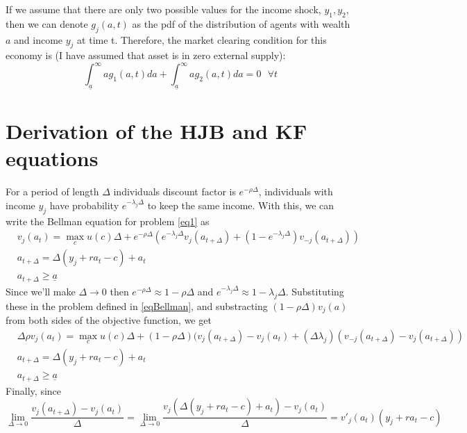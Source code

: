 \documentclass[12pt]{article}
\begin{document}
If we assume that there are only two possible values for the income shock, $y_1, y_2$, then we can denote $g_j(a,t)$ as the pdf of the distribution of agents with wealth $a$ and income $y_j$ at time t. Therefore, the market clearing condition for this economy is (I have assumed that asset is in zero external supply):
\begin{equation}
\int_{\underline{a}}^{\infty}a g_1(a,t)da+\int_{\underline{a}}^{\infty}a g_2(a,t)da=0 \text{   } \forall t
\end{equation}

\section{Derivation of the HJB and KF equations}
For a period of length $\Delta$ individuals discount factor is $e^{-\rho\Delta}$, individuals with income $y_j$ have probability $e^{-\lambda_j\Delta}$ to keep the same income. With this, we can write the Bellman equation for problem \ref{eq1} as
\begin{equation}\label{eqBellman}
\begin{split}
&v_j(a_t)=\max_{c} u(c)\Delta+e^{-\rho\Delta}(e^{-\lambda_j\Delta} v_j(a_{t+\Delta})+(1-e^{-\lambda_j\Delta} )v_{-j}(a_{t+\Delta}))\\
&a_{t+\Delta}=\Delta(y_j+ra_t-c)+a_t\\
&a_{t+\Delta}\geq \underline{a}
\end{split}
\end{equation}
Since we'll make $\Delta\rightarrow 0$ then $e^{-\rho\Delta}\approx 1-\rho\Delta$ and $e^{-\lambda_j\Delta}\approx1-\lambda_j\Delta$. Substituting these in the problem defined in \ref{eqBellman}, and substracting $(1-\rho\Delta)v_j(a)$ from both sides of the objective function, we get
\begin{equation}\label{eqBellman2}
\begin{split}
&\Delta\rho v_j(a_t)=\max_{c} u(c)\Delta+(1-\rho\Delta)( v_j(a_{t+\Delta})-v_j(a_t)+(\Delta\lambda_j)(v_{-j}(a_{t+\Delta})-v_{j}(a_{t+\Delta}))\\
&a_{t+\Delta}=\Delta(y_j+ra_t-c)+a_t\\
&a_{t+\Delta}\geq \underline{a}
\end{split}
\end{equation}
Finally, since
\begin{equation}
\lim_{\Delta\rightarrow0}\frac{v_j(a_{t+\Delta})-v_j(a_t)}{\Delta}=\lim_{\Delta\rightarrow0}\frac{v_j(\Delta(y_j+ra_t-c)+a_t)-v_j(a_t)}{\Delta}=v'_j(a_t)(y_j+ra_t-c)
\end{equation}
\end{document}
